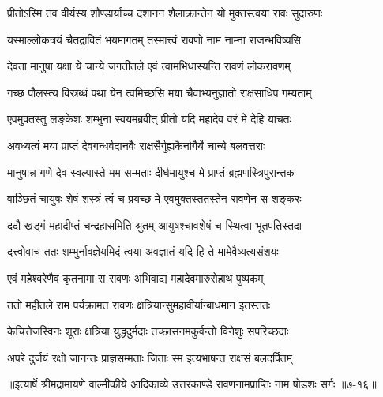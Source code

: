 \twolineshloka
{प्रीतोऽस्मि तव वीर्यस्य शौण्डार्याच्च दशानन}
{शैलाक्रान्तेन यो मुक्तस्त्वया रावः सुदारुणः} %

\twolineshloka
{यस्माल्लोकत्रयं चैतद्रावितं भयमागतम्}
{तस्मात्त्वं रावणो नाम नाम्ना राजन्भविष्यसि} %

\twolineshloka
{देवता मानुषा यक्षा ये चान्ये जगतीतले}
{एवं त्वामभिधास्यन्ति रावणं लोकरावणम्} %

\twolineshloka
{गच्छ पौलस्त्य विस्रब्धं पथा येन त्वमिच्छसि}
{मया चैवाभ्यनुज्ञातो राक्षसाधिप गम्यताम्} %

\twolineshloka
{एवमुक्तस्तु लङ्केशः शम्भुना स्वयमब्रवीत्}
{प्रीतो यदि महादेव वरं मे देहि याचतः} %

\twolineshloka
{अवध्यत्वं मया प्राप्तं देवगन्धर्वदानवैः}
{राक्षसैर्गुह्यकैर्नागैर्ये चान्ये बलवत्तराः} %

\twolineshloka
{मानुषान्न गणे देव स्वल्पास्ते मम सम्मताः}
{दीर्घमायुश्च मे प्राप्तं ब्रह्मणस्त्रिपुरान्तक} %

\twolineshloka
{वाञ्छितं चायुषः शेषं शस्त्रं त्वं च प्रयच्छ मे}
{एवमुक्तस्ततस्तेन रावणेन स शङ्करः} %

\twolineshloka
{ददौ खड्गं महादीप्तं चन्द्रहासमिति श्रुतम्}
{आयुषश्चावशेषं च स्थित्वा भूतपतिस्तदा} %

\twolineshloka
{दत्त्वोवाच ततः शम्भुर्नावज्ञेयमिदं त्वया}
{अवज्ञातं यदि हि ते मामेवैष्यत्यसंशयः} %

\twolineshloka
{एवं महेश्वरेणैव कृतनामा स रावणः}
{अभिवाद्य महादेवमारुरोहाथ पुष्पकम्} %

\twolineshloka
{ततो महीतले राम पर्यक्रामत रावणः}
{क्षत्रियान्सुमहावीर्यान्बाधमान इतस्ततः} %

\twolineshloka
{केचित्तेजस्विनः शूराः क्षत्रिया युद्धदुर्मदाः}
{तच्छासनमकुर्वन्तो विनेशुः सपरिच्छदाः} %

\twolineshloka
{अपरे दुर्जयं रक्षो जानन्तः प्राज्ञसम्मताः}
{जिताः स्म इत्यभाषन्त राक्षसं बलदर्पितम्} %


॥इत्यार्षे श्रीमद्रामायणे वाल्मीकीये आदिकाव्ये उत्तरकाण्डे रावणनामप्राप्तिः नाम षोडशः सर्गः ॥७-१६॥
